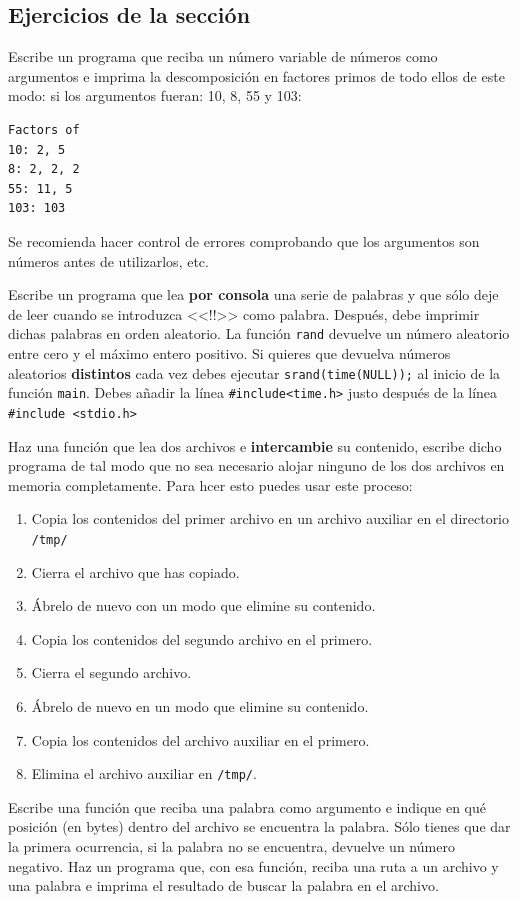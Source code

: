 \documentclass[a4paper]{article}
\begin{document}
\subsection{Ejercicios de la sección}
\begin{exercises}[resume*]
\item Escribe un programa que reciba un número variable de números como
argumentos e imprima la descomposición en factores primos de todo ellos de este
modo: si los argumentos fueran: 10, 8, 55 y 103:

\noindent
\begin{minipage}[H]{\linewidth}
\mbox{}
\begin{verbatim}
Factors of
10: 2, 5
8: 2, 2, 2
55: 11, 5
103: 103
\end{verbatim}
\end{minipage}

Se recomienda hacer control de errores comprobando que los argumentos son
números antes de utilizarlos, etc.
\item Escribe un programa que lea \textbf{por consola} una serie de palabras
y que sólo deje de leer cuando se introduzca <<!!>> como palabra. Después, debe
imprimir dichas palabras en orden aleatorio. La función \verb!rand! devuelve
un número aleatorio entre cero y el máximo entero positivo. Si quieres que
devuelva números aleatorios \textbf{distintos} cada vez debes ejecutar
\verb!srand(time(NULL));! al inicio de la función \verb!main!. Debes añadir
la línea \verb!#include<time.h>! justo después de la línea
\verb!#include <stdio.h>!

\item Haz una función que lea dos archivos e \textbf{intercambie} su contenido,
escribe dicho programa de tal modo que no sea necesario alojar ninguno de los
dos archivos en memoria completamente. Para hcer esto puedes usar este proceso:
\begin{enumerate}
\item Copia los contenidos del primer archivo
en un archivo auxiliar en el directorio \verb!/tmp/!
\item Cierra el archivo que has copiado.
\item Ábrelo de nuevo con un modo que elimine su contenido.
\item Copia los contenidos del segundo archivo en el primero.
\item Cierra el segundo archivo.
\item Ábrelo de nuevo en un modo que elimine su contenido.
\item Copia los contenidos del archivo auxiliar en el primero.
\item Elimina el archivo auxiliar en \verb!/tmp/!.
\end{enumerate}

\item Escribe una función que reciba una palabra como argumento e indique
en qué posición (en bytes) dentro del archivo se encuentra la palabra. Sólo
tienes que dar la primera ocurrencia, si la palabra no se encuentra, devuelve
un número negativo. Haz un programa que, con esa función, reciba una ruta a un
archivo y una palabra e imprima el resultado de buscar la palabra en el archivo.
\end{exercises}
\end{document}
